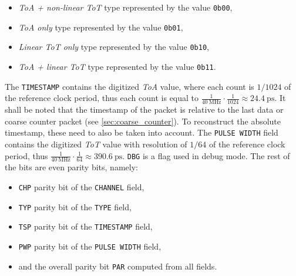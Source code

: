 \begin{itemize}
    \item \emph{ToA + non-linear ToT} type represented by the value \verb|0b00|,
    \item \emph{ToA only} type represented by the value \verb|0b01|,
    \item \emph{Linear ToT only} type represented by the value \verb|0b10|,
    \item \emph{ToA + linear ToT} type represented by the value \verb|0b11|.
\end{itemize}
%
The \verb|TIMESTAMP| contains the digitized \emph{ToA} value, where each count is $1/1024$ of the reference clock period, thus each count is equal to $\frac{1}{\SI{40}{\mega\hertz}} \cdot \frac{1}{1024} \approx \SI{24.4}{\pico\second} $. It shall be noted that the timestamp of the packet is relative to the last data or coarse counter packet (see \ref{sec:coarse_counter}). To reconstruct the absolute timestamp, these need to also be taken into account. The \verb|PULSE WIDTH| field contains the digitized \emph{ToT} value with resolution of $1/64$ of the reference clock period, thus $\frac{1}{\SI{40}{\mega\hertz}} \cdot \frac{1}{64} \approx \SI{390.6}{\pico\second}$. \verb|DBG| is a flag used in debug mode. \cite{ficDatasheet}  The rest of the bits are even parity bits, namely:
\begin{itemize}
    \item \verb|CHP| parity bit of the \verb|CHANNEL| field,
    \item \verb|TYP| parity bit of the \verb|TYPE| field,
    \item \verb|TSP| parity bit of the \verb|TIMESTAMP| field,
    \item \verb|PWP| parity bit of the \verb|PULSE WIDTH| field,
    \item and the overall parity bit \verb|PAR| computed from all fields.
\end{itemize}

